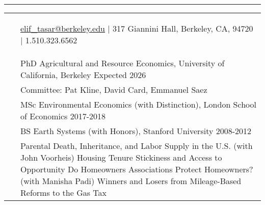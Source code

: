 \documentclass[letterpaper,10pt,oneside]{article}
\newenvironment{myresume}[2]{\pdfbookmark{#1}{#1}{\LARGE{\textbf{#1}}}\vspace{1mm}\hrule\vspace{-2mm}\begin{longtable}{p{0.12\textwidth} p{0.8\textwidth}}&#2}{\end{longtable}}
\renewcommand{\section}[2]{\vspace{-1.5em}\\\pdfbookmark{#1}{#2}{\singlespace\textsc{#1}}&}
\newcommand{\firstentry}[1]{\vspace{0em}\newline#1\vspace{0em}}
\newcommand{\entry}[1]{\vspace{-1em}\\~&#1}
\begin{document}

\begin{myresume}{}
\smallskip
\begin{center}
    \vspace{-2em}\hspace{-7em} \href{mailto: elif_tasar@berkeley.edu}{elif\_tasar@berkeley.edu} $\vert$ 317 Giannini Hall, Berkeley, CA, 94720 $\vert$ 1.510.323.6562 \vspace{-2em}
\end{center}

\bigskip
\bigskip


\section{Education}{education}

\firstentry{
PhD Agricultural and Resource Economics, University of California, Berkeley \hfill Expected 2026
}

\entry{Committee: Pat Kline, David Card, Emmanuel Saez}

\entry{MSc Environmental Economics (with Distinction), London School of Economics \hfill 2017-2018
}

\entry{
BS Earth Systems (with Honors), Stanford University \hfill 2008-2012
}


\section{Working \newline Papers}{wps}
\firstentry{[1] Parental Death, Inheritance, and Labor Supply in the U.S. (with John Voorheis)
\newline [2] Housing Tenure Stickiness and Access to Opportunity
\newline [3] Do Homeowners Associations Protect Homeowners? (with Manisha Padi)
\newline [4] Winners and Losers from Mileage-Based Reforms to the Gas Tax
}

\vspace{1.5em}



\end{myresume}
\end{document}

